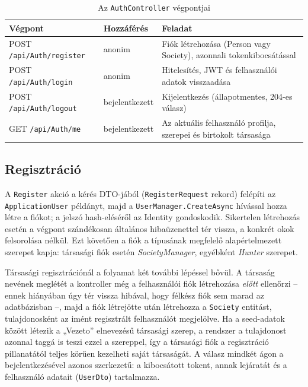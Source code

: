 \begin{table}[htbp]
	\centering
	\caption{Az \texttt{AuthController} végpontjai}
	\label{tab:auth-endpoints}
	\begin{tabular}{|l|l|p{6.6cm}|}
		\hline
		\textbf{Végpont} & \textbf{Hozzáférés} & \textbf{Feladat} \\
		\hline
		POST \texttt{/api/Auth/register} & anonim & Fiók létrehozása (Person vagy Society), azonnali tokenkibocsátással \\
		\hline
		POST \texttt{/api/Auth/login} & anonim & Hitelesítés, JWT és felhasználói adatok visszaadása \\
		\hline
		POST \texttt{/api/Auth/logout} & bejelentkezett & Kijelentkezés (állapotmentes, 204-es válasz) \\
		\hline
		GET \texttt{/api/Auth/me} & bejelentkezett & Az aktuális felhasználó profilja, szerepei és birtokolt társasága \\
		\hline
	\end{tabular}
\end{table}

\subsection{Regisztráció}

A \texttt{Register} akció a kérés DTO-jából (\texttt{RegisterRequest} rekord) felépíti az
\texttt{ApplicationUser} példányt, majd a \texttt{UserManager.CreateAsync} hívással hozza létre a
fiókot; a jelszó hash-eléséről az Identity gondoskodik. Sikertelen létrehozás esetén a végpont
szándékosan általános hibaüzenettel tér vissza, a konkrét okok felsorolása nélkül. Ezt követően a
fiók a típusának megfelelő alapértelmezett szerepet kapja: társasági fiók esetén
\emph{SocietyManager}, egyébként \emph{Hunter} szerepet.

Társasági regisztrációnál a folyamat két további lépéssel bővül. A társaság nevének meglétét a
kontroller még a felhasználói fiók létrehozása \emph{előtt} ellenőrzi -- ennek hiányában úgy tér
vissza hibával, hogy félkész fiók sem marad az adatbázisban --, majd a fiók létrejötte után
létrehozza a \texttt{Society} entitást, tulajdonosként az imént regisztrált felhasználót
megjelölve. Ha a
seed-adatok között létezik a „Vezeto” elnevezésű társasági szerep, a rendszer a tulajdonost azonnal
taggá is teszi ezzel a szereppel, így a társasági fiók a regisztráció pillanatától teljes körűen
kezelheti saját társaságát. A válasz mindkét ágon a bejelentkezésével azonos szerkezetű: a
kibocsátott tokent, annak lejáratát és a felhasználó adatait (\texttt{UserDto}) tartalmazza.

